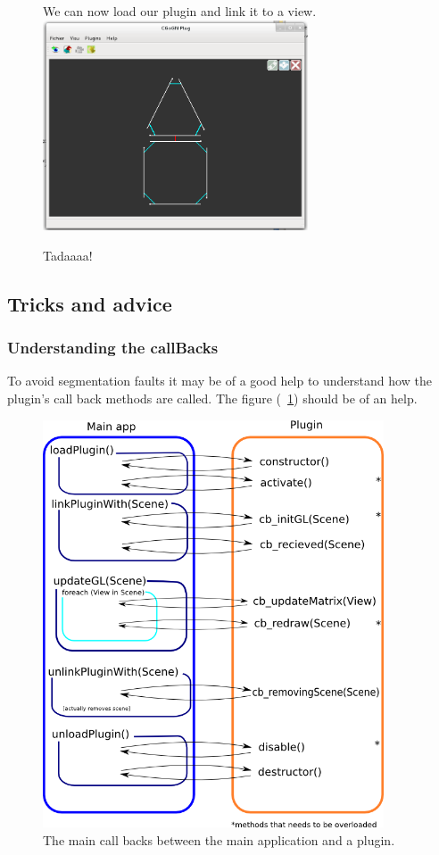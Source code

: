 \documentclass[a4paper]{scrreprt}
\begin{document}
	\begin{figure}[h!p]
		We can now load our plugin and link it to a view.\\
		\centering
		\includegraphics[width=0.7\textwidth]{images/screenshot28}
		\caption{Tadaaaa!}
	\end{figure}
	
	
	
	\FloatBarrier
\subsection{Tricks and advice}
	\subsubsection{Understanding the callBacks}
	To avoid segmentation faults it may be of a good help to understand how the
	plugin's call back methods are called. The figure (~\ref{fig:callBacks}) should
	be of an help.
	\begin{figure}[h!p]
		\centering
		\includegraphics[width=0.9\textwidth]{images/callBacks}
		\caption{The main call backs between the main application and a plugin.}
		\label{fig:callBacks}
	\end{figure}
	
\end{document}
